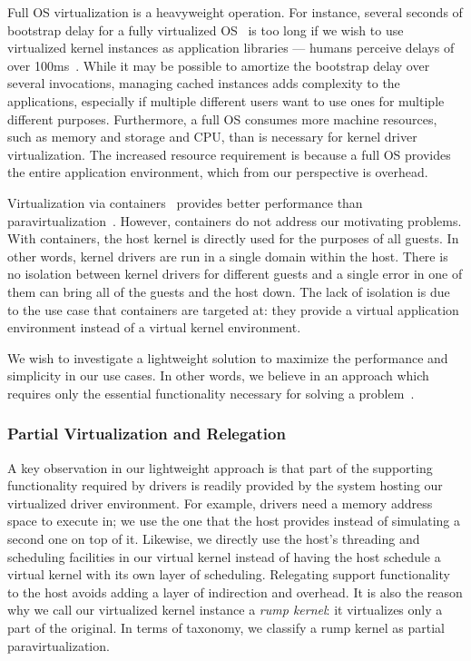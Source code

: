 Full OS virtualization is a heavyweight operation.  For
instance, several seconds of bootstrap delay for a fully virtualized
OS~\cite{jiang:soda} is too long if we wish to use virtualized
kernel instances as application libraries --- humans perceive delays
of over 100ms~\cite{miller:100ms}.  While it may be possible to
amortize the bootstrap delay over several invocations, managing
cached instances adds complexity to the applications, especially
if multiple different users want to use ones for multiple different
purposes.  Furthermore, a full OS consumes more machine resources,
such as memory and storage and CPU, than is necessary for kernel
driver virtualization.  The increased resource requirement is because
a full OS provides the entire application environment, which from our
perspective is overhead.

Virtualization via containers~\cite{phk:jails} provides better
performance than
paravirtualization~\cite{soltesz:containers,wang:overhead}.
However, containers do not address our motivating problems.
With containers, the host kernel is directly used for the purposes
of all guests.  In other words, kernel drivers are run in a single
domain within the host.  There is no isolation between kernel
drivers for different guests and a single error in one of them can
bring all of the guests and the host down.  The lack of isolation is due
to the use case that containers are targeted at: they provide a virtual
application environment instead of a virtual kernel environment.

We wish to investigate a lightweight solution to maximize the
performance and simplicity in our use cases.  In other words, we
believe in an approach which requires only the essential
functionality necessary for solving a
problem~\cite{lampson:bestpaperever}.

\subsubsection{Partial Virtualization and Relegation}

A key observation in our lightweight approach is that part of the
supporting functionality required by drivers is readily provided
by the system hosting our virtualized driver environment.  For
example, drivers need a memory address space to execute in; we use
the one that the host provides instead of simulating a second one
on top of it.  Likewise, we directly use the host's threading and
scheduling facilities in our virtual kernel instead of having the
host schedule a virtual kernel with its own layer of scheduling.
Relegating support functionality to the host avoids adding a layer
of indirection and overhead.  It is also the reason why we call
our virtualized kernel instance a \textit{rump kernel}: it virtualizes
only a part of the original.  In terms of taxonomy, we classify a
rump kernel as partial paravirtualization.

